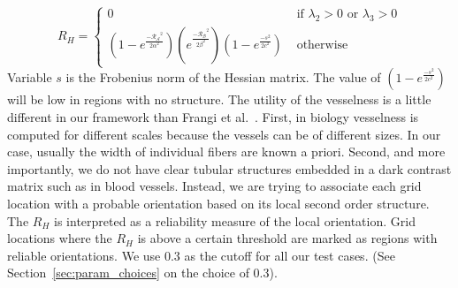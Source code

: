 $$
R_{H} = \left\{ \begin{array}{ccc}
 0 & \mbox{ if $\lambda_{2}>0$ or $\lambda_{3}>0$} \\
  (1-e^{\frac{\mathcal{-R_{A}}^{2}}{2\alpha^{2}}})
  (e^{\frac{\mathcal{-R_{B}}^{2}}{2\beta^{2}}}) (1-e^{\frac{-s^2}{2c^2}}) &\mbox{ otherwise}
       \end{array} \right.
$$
Variable $s$ is the Frobenius norm of the Hessian matrix. The value  of $(1-e^{\frac{-s^2}{2c^2}})$ will be low in regions with no structure. The utility of the vesselness is a little different in our framework than Frangi et al.~\cite{Frangi1998}.
First, in biology vesselness is computed for different scales because the vessels can be of different sizes. In our case, usually the width of individual fibers are known a priori.
Second, and more importantly, we do not have clear tubular structures embedded in a dark contrast matrix such as in blood vessels.
Instead, we are trying to associate each grid location  with a probable orientation based on its local second order structure. The $R_{H}$ is interpreted as a reliability measure of the local orientation.
Grid locations where the $R_{H}$ is above a certain threshold are marked as regions with reliable orientations.
We use 0.3 as the cutoff for all our test cases. (See Section~\ref{sec:param_choices} on the choice of 0.3).
